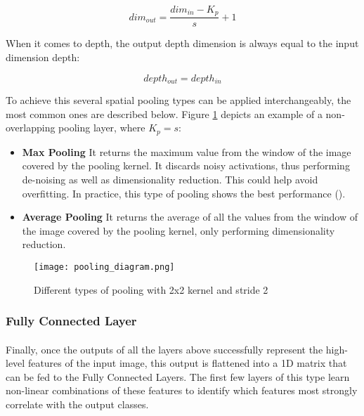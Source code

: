 \begin{equation}
    \label{pool_dim_eq}
    dim_{out} = \frac{dim_{in} - K_p}{s} + 1
\end{equation}

When it comes to depth, the output depth dimension is always equal to the input dimension depth:

\begin{equation}
    \label{pool_depth_eq}
    depth_{out} = depth_{in}
\end{equation}

To achieve this several spatial pooling types can be applied interchangeably, the most common ones are described below. Figure \ref{fig_pooling} depicts an example of a non-overlapping pooling layer, where $K_p = s$:

\begin{itemize}
    \item \textbf{Max Pooling} It returns the maximum value from the window of the image covered by the pooling kernel. It discards noisy activations, thus performing de-noising as well as dimensionality reduction. This could help avoid overfitting. In practice, this type of pooling shows the best performance (\cite{GoodBengCour16}).
    \item \textbf{Average Pooling} It returns the average of all the values from the window of the image covered by the pooling kernel, only performing dimensionality reduction.
\end{itemize}

    \begin{figure}[hbt!]
        \centering
        \texttt{[image: pooling\_diagram.png]}
        \caption{Different types of pooling with 2x2 kernel and stride 2}
        \label{fig_pooling}
    \end{figure}
    

\subsubsection{Fully Connected Layer}
\paragraph{}
Finally, once the outputs of all the layers above successfully represent the high-level features of the input image, this output is flattened into a 1D matrix that can be fed to the Fully Connected Layers. The first few layers of this type learn non-linear combinations of these features to identify which features most strongly correlate with the output classes.

